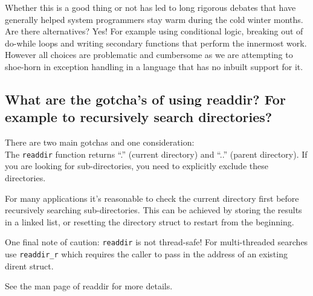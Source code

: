 \begin{Shaded}
\begin{Highlighting}[]
 
    
    

    
\NormalTok{\}}
\end{Highlighting}
\end{Shaded}

Whether this is a good thing or not has led to long rigorous debates
that have generally helped system programmers stay warm during the cold
winter months. Are there alternatives? Yes! For example using
conditional logic, breaking out of do-while loops and writing secondary
functions that perform the innermost work. However all choices are
problematic and cumbersome as we are attempting to shoe-horn in
exception handling in a language that has no inbuilt support for it.

\subsection{What are the gotcha's of using readdir? For example to
recursively search
directories?}\label{what-are-the-gotchas-of-using-readdir-for-example-to-recursively-search-directories}

There are two main gotchas and one consideration:\\The \texttt{readdir}
function returns ``.'' (current directory) and ``..'' (parent
directory). If you are looking for sub-directories, you need to
explicitly exclude these directories.

For many applications it's reasonable to check the current directory
first before recursively searching sub-directories. This can be achieved
by storing the results in a linked list, or resetting the directory
struct to restart from the beginning.

One final note of caution: \texttt{readdir} is not thread-safe! For
multi-threaded searches use \texttt{readdir\_r} which requires the
caller to pass in the address of an existing dirent struct.

See the man page of readdir for more details.

